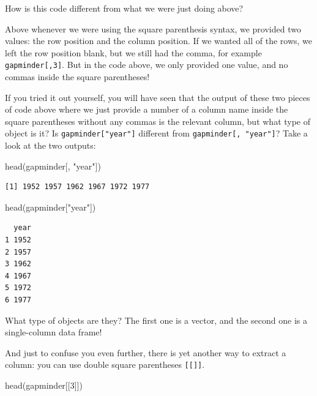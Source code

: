 \documentclass[
  letterpaper,
  DIV=11,
  numbers=noendperiod]{scrreprt}
\newenvironment{Shaded}{\begin{snugshade}}{\end{snugshade}}
\newcommand{\DecValTok}[1]{\textcolor[rgb]{0.68,0.00,0.00}{#1}}
\newcommand{\FunctionTok}[1]{\textcolor[rgb]{0.28,0.35,0.67}{#1}}
\newcommand{\NormalTok}[1]{\textcolor[rgb]{0.00,0.23,0.31}{#1}}
\newcommand{\StringTok}[1]{\textcolor[rgb]{0.13,0.47,0.30}{#1}}
\begin{document}
How is this code different from what we were just doing above?

Above whenever we were using the square parenthesis syntax, we provided
two values: the row position and the column position. If we wanted all
of the rows, we left the row position blank, but we still had the comma,
for example \texttt{gapminder{[},3{]}}. But in the code above, we only
provided one value, and no commas inside the square parentheses!

If you tried it out yourself, you will have seen that the output of
these two pieces of code above where we just provide a number of a
column name inside the square parentheses without any commas is the
relevant column, but what type of object is it? Is
\texttt{gapminder{[}"year"{]}} different from
\texttt{gapminder{[},\ "year"{]}}? Take a look at the two outputs:

\begin{Shaded}
\begin{Highlighting}[]
\FunctionTok{head}\NormalTok{(gapminder[, }\StringTok{"year"}\NormalTok{])}
\end{Highlighting}
\end{Shaded}

\begin{verbatim}
[1] 1952 1957 1962 1967 1972 1977
\end{verbatim}

\begin{Shaded}
\begin{Highlighting}[]
\FunctionTok{head}\NormalTok{(gapminder[}\StringTok{"year"}\NormalTok{])}
\end{Highlighting}
\end{Shaded}

\begin{verbatim}
  year
1 1952
2 1957
3 1962
4 1967
5 1972
6 1977
\end{verbatim}

What type of objects are they? The first one is a vector, and the second
one is a single-column data frame!

And just to confuse you even further, there is yet another way to
extract a column: you can use double square parentheses
\texttt{{[}{[}{]}{]}}.

\begin{Shaded}
\begin{Highlighting}[]
\FunctionTok{head}\NormalTok{(gapminder[[}\DecValTok{3}\NormalTok{]])}
\end{Highlighting}
\end{Shaded}
\end{document}
